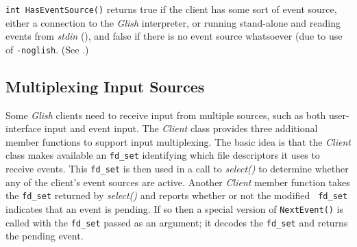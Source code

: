 \begin{sloppy}
\begin{list}{}{}
\item[{\tt int HasEventSource()}] returns
true if the client has some sort of event source, either a connection
to the {\em Glish} interpreter, or running stand-alone and reading events
from {\em stdin} (), and false if there is no event
source whatsoever (due to use of {\tt -noglish}.  (See
.)

\end{list}
\end{sloppy}

\subsection{Multiplexing Input Sources}
\label{multiplexing}

Some {\em Glish} clients need to receive input from multiple sources, such as
both user-interface input and event input.  The {\em Client} class
provides three additional member functions to support input
multiplexing.  The basic idea is that the {\em Client} class makes
available an {\tt fd\_set} identifying which file descriptors it uses to
receive events.  This {\tt fd\_set} is then used in a call to {\em
select()} to determine whether any of the client's event sources are
active.  Another {\em Client} member function takes the {\tt fd\_set}
returned by {\em select()} and reports whether or not the modified {\tt
{}
fd\_set} indicates that an event is pending.  If so then a special version
of {\tt NextEvent()} is called with the {\tt fd\_set} passed as an
argument; it decodes the {\tt fd\_set} and returns the pending event.

